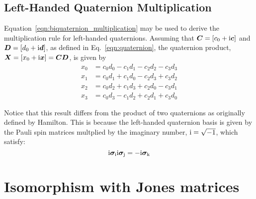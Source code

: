 \documentclass[12pt]{article}
\newcommand{\Ci}{{\rm i}}
\newcommand{\pauli}[1]{\ensuremath{ {\bm\sigma}_{\rm #1} }}
\begin{document}
\subsection{Left-Handed Quaternion Multiplication}
\label{sec:qmult}
Equation~\ref{eqn:biquaternion_multiplication} may be used to derive
the multiplication rule for left-handed quaternions.  Assuming that
$\bm{C}=[c_0+\Ci\bm{c}]$ and $\bm{D}=[d_0+\Ci\bm{d}]$, as defined in
Eq.~\ref{eqn:quaternion}, the quaternion product,
$\bm{X}=[x_0+\Ci\bm{x}]=\bm{CD}$, is given by
\begin{equation}\label{eqn:quaternion_multiplication}
\begin{array}{rl}
x_0 & = c_0d_0 - c_1d_1 - c_2d_2 - c_3d_3 \\
x_1 & = c_0d_1 + c_1d_0 - c_2d_3 + c_3d_2 \\
x_2 & = c_0d_2 + c_1d_3 + c_2d_0 - c_3d_1 \\
x_3 & = c_0d_3 - c_1d_2 + c_2d_1 + c_3d_0
\end{array}
\end{equation}

Notice that this result differs from the product of two quaternions as
originally defined by Hamilton.  This is because the left-handed
quaternion basis is given by the Pauli spin matrices multplied by the
imaginary number, $\Ci=\sqrt{-1}$, which satisfy:
\begin{equation}
\Ci\pauli{i} \Ci\pauli{j} = -\Ci\pauli{k}
\end{equation}


\section{Isomorphism with Jones matrices}
\end{document}
